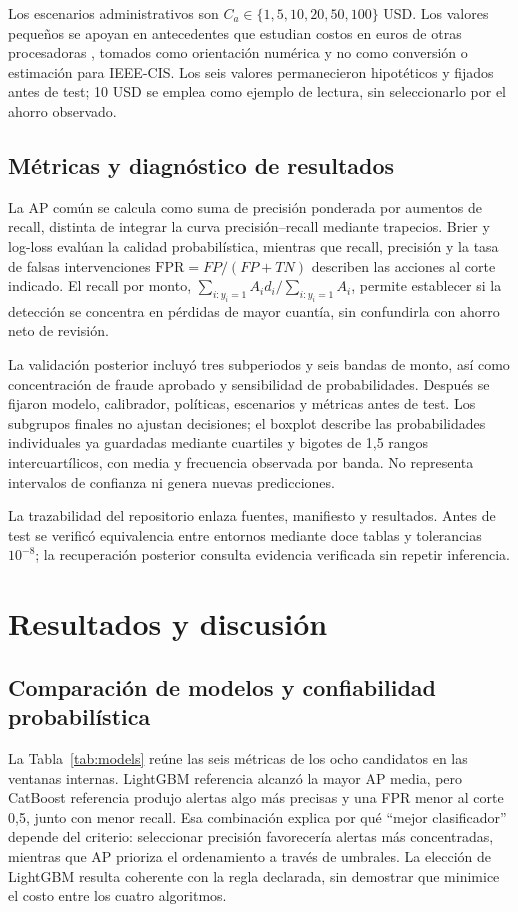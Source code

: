 \documentclass[conference,letterpaper]{IEEEtran}
\newcommand{\Ca}{C_a}
\begin{document}
Los escenarios administrativos son $\Ca\in\{1,5,10,20,50,100\}$ USD. Los valores pequeños se apoyan en antecedentes que estudian costos en euros de otras procesadoras \cite{bmr,calibrated}, tomados como orientación numérica y no como conversión o estimación para IEEE-CIS. Los seis valores permanecieron hipotéticos y fijados antes de test; 10 USD se emplea como ejemplo de lectura, sin seleccionarlo por el ahorro observado.

\subsection{Métricas y diagnóstico de resultados}
La AP común se calcula como suma de precisión ponderada por aumentos de recall, distinta de integrar la curva precisión--recall mediante trapecios. Brier y log-loss evalúan la calidad probabilística, mientras que recall, precisión y la tasa de falsas intervenciones $\mathrm{FPR}=FP/(FP+TN)$ describen las acciones al corte indicado. El recall por monto, $\sum_{i:y_i=1}A_id_i/\sum_{i:y_i=1}A_i$, permite establecer si la detección se concentra en pérdidas de mayor cuantía, sin confundirla con ahorro neto de revisión.

La validación posterior incluyó tres subperiodos y seis bandas de monto, así como concentración de fraude aprobado y sensibilidad de probabilidades. Después se fijaron modelo, calibrador, políticas, escenarios y métricas antes de test. Los subgrupos finales no ajustan decisiones; el boxplot describe las probabilidades individuales ya guardadas mediante cuartiles y bigotes de 1,5 rangos intercuartílicos, con media y frecuencia observada por banda. No representa intervalos de confianza ni genera nuevas predicciones.

La trazabilidad del repositorio \cite{repo} enlaza fuentes, manifiesto y resultados. Antes de test se verificó equivalencia entre entornos mediante doce tablas y tolerancias $10^{-8}$; la recuperación posterior consulta evidencia verificada sin repetir inferencia.

\section{Resultados y discusión}
\subsection{Comparación de modelos y confiabilidad probabilística}
La Tabla~\ref{tab:models} reúne las seis métricas de los ocho candidatos en las ventanas internas. LightGBM referencia alcanzó la mayor AP media, pero CatBoost referencia produjo alertas algo más precisas y una FPR menor al corte 0,5, junto con menor recall. Esa combinación explica por qué ``mejor clasificador'' depende del criterio: seleccionar precisión favorecería alertas más concentradas, mientras que AP prioriza el ordenamiento a través de umbrales. La elección de LightGBM resulta coherente con la regla declarada, sin demostrar que minimice el costo entre los cuatro algoritmos.
\end{document}
